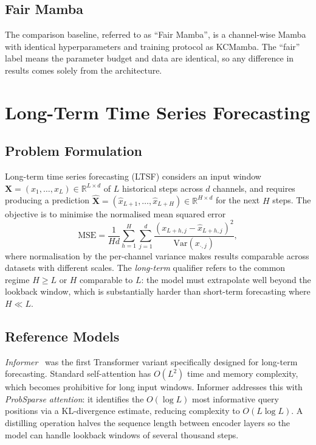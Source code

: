 \subsection{Fair Mamba}

The comparison baseline, referred to as ``Fair Mamba'', is a channel-wise Mamba
with identical hyperparameters and training protocol as KCMamba. The ``fair''
label means the parameter budget and data are identical, so any difference in
results comes solely from the architecture.

\section{Long-Term Time Series Forecasting}
\label{sec:ltsf}

\subsection{Problem Formulation}

Long-term time series forecasting (LTSF) considers an input window
$\mathbf{X} = (x_1, \ldots, x_L) \in \mathbb{R}^{L \times d}$ of $L$
historical steps across $d$ channels, and requires producing a prediction
$\hat{\mathbf{X}} = (\hat{x}_{L+1}, \ldots, \hat{x}_{L+H}) \in \mathbb{R}^{H \times d}$
for the next $H$ steps. The objective is to minimise the normalised mean
squared error
\begin{equation}
    \mathrm{MSE} = \frac{1}{H d}
        \sum_{h=1}^{H} \sum_{j=1}^{d}
        \frac{(x_{L+h,j} - \hat{x}_{L+h,j})^2}{\mathrm{Var}(x_{\cdot,j})},
    \label{eq:mse}
\end{equation}
where normalisation by the per-channel variance makes results comparable
across datasets with different scales. The \emph{long-term} qualifier refers
to the common regime $H \geq L$ or $H$ comparable to $L$: the model must
extrapolate well beyond the lookback window, which is substantially harder
than short-term forecasting where $H \ll L$.

\subsection{Reference Models}

\emph{Informer}~\cite{zhou2021informer} was the first Transformer variant
specifically designed for long-term forecasting. Standard self-attention has
$O(L^2)$ time and memory complexity, which becomes prohibitive for long input
windows. Informer addresses this with \emph{ProbSparse attention}: it
identifies the $O(\log L)$ most informative query positions via a KL-divergence
estimate, reducing complexity to $O(L \log L)$. A distilling operation
halves the sequence length between encoder layers so the model can handle
lookback windows of several thousand steps.

